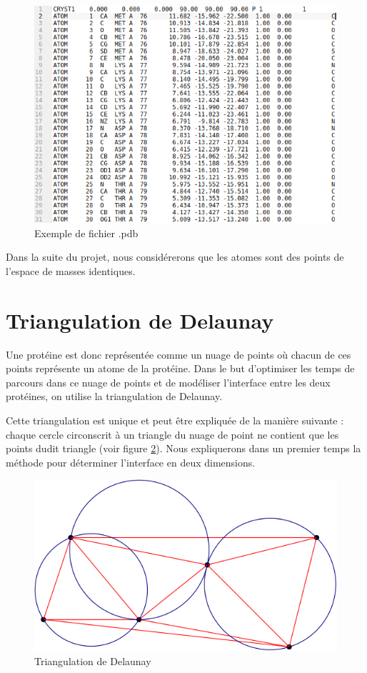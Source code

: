 \begin{figure}[ht]
  \includegraphics[width=\textwidth]{figures/pdb_example.png}
  \caption{Exemple de fichier .pdb}
  \label{fig::pdb_file}
\end{figure}

Dans la suite du projet, nous considérerons que les atomes sont des points de l'espace
de masses identiques.



\section{Triangulation de Delaunay}

Une protéine est donc représentée comme un nuage de points où chacun de ces points
représente un atome de la protéine. Dans le but d'optimiser les temps de parcours dans
ce nuage de points et de modéliser l'interface entre les deux protéines,
 on utilise la triangulation de Delaunay.

 Cette triangulation est unique et peut être expliquée de la manière suivante :
 chaque cercle circonscrit à un triangle du nuage de point ne contient que les points
 dudit triangle (voir figure \ref{fig::explication_delaunay}). Nous expliquerons dans un premier
 temps la méthode pour déterminer l'interface en deux dimensions.

\begin{figure}[ht]
\centering
  \includegraphics[width=\textwidth]{figures/explication_delaunay.png}
  \caption{Triangulation de Delaunay}
  \label{fig::explication_delaunay}
\end{figure}

